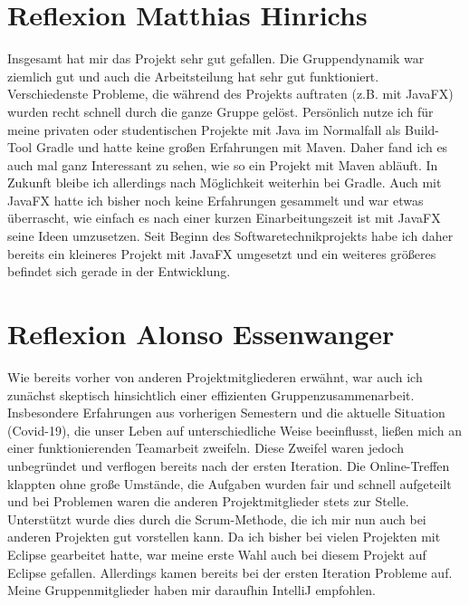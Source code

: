 \section{Reflexion Matthias Hinrichs}
Insgesamt hat mir das Projekt sehr gut gefallen. Die Gruppendynamik war ziemlich gut und auch die Arbeitsteilung hat sehr gut funktioniert. Verschiedenste Probleme, die während des Projekts auftraten (z.B. mit JavaFX) wurden recht schnell durch die ganze Gruppe gelöst. Persönlich nutze ich für meine privaten oder studentischen Projekte mit Java im Normalfall als Build-Tool Gradle und hatte keine großen Erfahrungen mit Maven. Daher fand ich es auch mal ganz Interessant zu sehen, wie so ein Projekt mit Maven abläuft. In Zukunft bleibe ich allerdings nach Möglichkeit weiterhin bei Gradle. Auch mit JavaFX hatte ich bisher noch keine Erfahrungen gesammelt und war etwas überrascht, wie einfach es nach einer kurzen Einarbeitungszeit ist mit JavaFX seine Ideen umzusetzen. Seit Beginn des Softwaretechnikprojekts habe ich daher bereits ein kleineres Projekt mit JavaFX umgesetzt und ein weiteres größeres befindet sich gerade in der Entwicklung.

\section{Reflexion Alonso Essenwanger}
Wie bereits vorher von anderen Projektmitgliederen erwähnt, war auch ich zunächst skeptisch hinsichtlich einer effizienten Gruppenzusammenarbeit. Insbesondere Erfahrungen aus vorherigen Semestern und die aktuelle Situation (Covid-19), die unser Leben auf unterschiedliche Weise beeinflusst, ließen mich an einer funktionierenden Teamarbeit zweifeln. Diese Zweifel waren jedoch unbegründet und verflogen bereits nach der ersten Iteration. Die Online-Treffen klappten ohne große Umstände, die Aufgaben wurden fair und schnell aufgeteilt und bei Problemen waren die anderen Projektmitglieder stets zur Stelle. Unterstützt wurde dies durch die Scrum-Methode, die ich mir nun auch bei anderen Projekten gut vorstellen kann. Da ich bisher bei vielen Projekten mit Eclipse gearbeitet hatte, war meine erste Wahl auch bei diesem Projekt auf Eclipse gefallen. Allerdings kamen bereits bei der ersten Iteration Probleme auf. Meine Gruppenmitglieder haben mir daraufhin IntelliJ empfohlen.